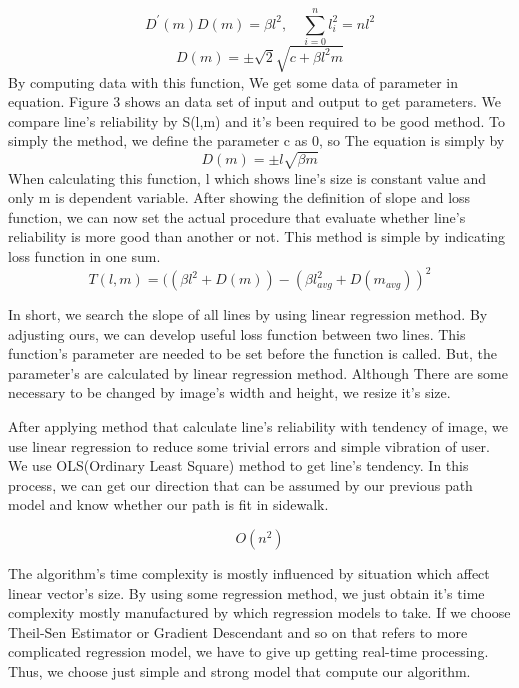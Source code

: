 {\begin{equation}
\mathit{{D}^{\prime}(m)D(m) = \beta{l}^{2},\quad\sum_{i=0}^{n}{{l}_{i}^{2}} = n{l}^{2}}
\end{equation}
\begin{equation}
\mathit{D(m)=\pm\sqrt{2}\sqrt{c+\beta{l}^{2}m}}
\end{equation}
By computing data with this function, We get some data of parameter in equation. Figure 3 shows an data set of input and output to get parameters. We compare line's reliability by S(l,m) and it's been required to be good method. To simply the method, we define the parameter c as 0, so The equation is simply by
\begin{equation}
\mathit{D(m)=\pm l\sqrt{\beta m}}
\end{equation}
When calculating this function, l which shows line's size is constant value and only m is dependent variable. After showing the definition of slope and loss function, we can now set the actual procedure that evaluate whether line's reliability is more good than another or not. This method is simple by indicating loss function in one sum.
\begin{equation}
\mathit{T(l,m) = ((\beta l^{2}+D(m)) - (\beta {l}_{avg}^{2}+D(m_{avg}))^{2}}
\end{equation}

In short, we search the slope of all lines by using linear regression method. By adjusting ours, we can develop useful loss function between two lines. This function's parameter are needed to be set before the function is called. But, the parameter's are calculated by linear regression method. Although There are some necessary to be changed by image's width and height, we resize it's size.\quad
 
After applying method that calculate line's reliability with tendency of image, we use linear regression to reduce some trivial errors and simple vibration of user. We use OLS(Ordinary Least Square) method to get line's tendency. In this process, we can get our direction that can be assumed by our previous path model and know whether our path is fit in sidewalk. 

\begin{equation}
\mathit{O(n^2)}
\end{equation}

The algorithm's time complexity is mostly influenced by situation which affect linear vector's size. By using some regression method, we just obtain it's time complexity mostly manufactured by which regression models to take. If we choose Theil-Sen Estimator or Gradient Descendant and so on that refers to more complicated regression model, we have to give up getting real-time processing. Thus, we choose just simple and strong model that compute our algorithm.
}